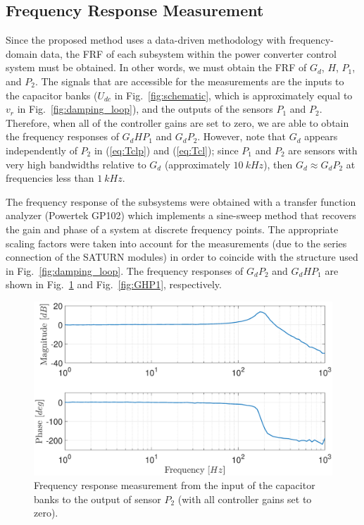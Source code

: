 \documentclass[a4paper, 10pt, conference]{ieeeconf}
\begin{document}
\subsection{Frequency Response Measurement}
Since the proposed method uses a data-driven methodology with frequency-domain data, the FRF of each subsystem within the power converter control system must be obtained. In other words, we must obtain the FRF of $G_d$, $H$, $P_1$, and $P_2$. The signals that are accessible for the measurements are the inputs to the capacitor banks ($U_{dc}$ in Fig.~\ref{fig:schematic}, which is approximately equal to $v_r$ in Fig.~\ref{fig:damping_loop}), and the outputs of the sensors $P_1$ and $P_2$. Therefore, when all of the controller gains are set to zero, we are able to obtain the frequency responses of $G_dHP_1$ and $G_dP_2$. However, note that $G_d$ appears independently of $P_2$ in (\ref{eq:Tclp}) and (\ref{eq:Tcl}); since $P_1$ and $P_2$ are sensors with very high bandwidths relative to $G_d$ (approximately $10 \: kHz$), then $G_d \approx G_dP_2$  at frequencies less than $1 \: kHz$. 

The frequency response of the subsystems were obtained with a transfer function analyzer (Powertek GP102) which implements a sine-sweep method that recovers the gain and phase of a system at discrete frequency points. The appropriate scaling factors were taken into account for the measurements (due to the series connection of the SATURN modules) in order to coincide with the structure used in Fig.~\ref{fig:damping_loop}. The frequency responses of $G_dP_2$ and $G_dHP_1$ are shown in Fig.~\ref{fig:G} and Fig.~\ref{fig:GHP1}, respectively.

\begin{figure}
\centering
\includegraphics[width=\columnwidth]{../pics/G.eps}
\caption{Frequency response measurement from the input of the capacitor banks to the output of sensor $P_2$ (with all controller gains set to zero).}
\label{fig:G}
\end{figure} 
\end{document}
